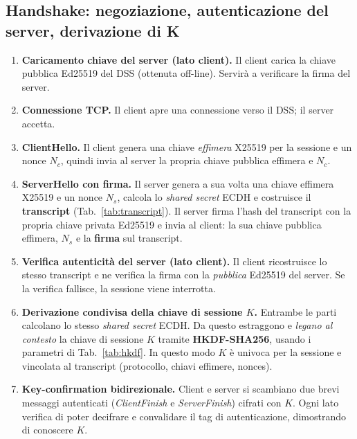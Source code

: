 \subsection{Handshake: negoziazione, autenticazione del server, derivazione di K}
\begin{enumerate}
  \item \textbf{Caricamento chiave del server (lato client).} Il client carica la chiave pubblica Ed25519 del DSS (ottenuta off-line). Servirà a verificare la firma del server.
  \item \textbf{Connessione TCP.} Il client apre una connessione verso il DSS; il server accetta.
  \item \textbf{ClientHello.} Il client genera una chiave \emph{effimera} X25519 per la sessione e un nonce $N_c$, quindi invia al server la propria chiave pubblica effimera e $N_c$.
  \item \textbf{ServerHello con firma.} Il server genera a sua volta una chiave effimera X25519 e un nonce $N_s$, calcola lo \emph{shared secret} ECDH e costruisce il \textbf{transcript} (Tab.~\ref{tab:transcript}). Il server firma l'hash del transcript con la propria chiave privata Ed25519 e invia al client: la sua chiave pubblica effimera, $N_s$ e la \textbf{firma} sul transcript.
  \item \textbf{Verifica autenticità del server (lato client).} Il client ricostruisce lo stesso transcript e ne verifica la firma con la \emph{pubblica} Ed25519 del server. Se la verifica fallisce, la sessione viene interrotta.
  \item \textbf{Derivazione condivisa della chiave di sessione $K$.} Entrambe le parti calcolano lo stesso \emph{shared secret} ECDH. Da questo estraggono e \emph{legano al contesto} la chiave di sessione $K$ tramite \textbf{HKDF-SHA256}, usando i parametri di Tab.~\ref{tab:hkdf}. In questo modo $K$ è univoca per la sessione e vincolata al transcript (protocollo, chiavi effimere, nonces).
  \item \textbf{Key-confirmation bidirezionale.} Client e server si scambiano due brevi messaggi autenticati (\emph{ClientFinish} e \emph{ServerFinish}) cifrati con $K$. Ogni lato verifica di poter decifrare e convalidare il tag di autenticazione, dimostrando di conoscere $K$.
\end{enumerate}

